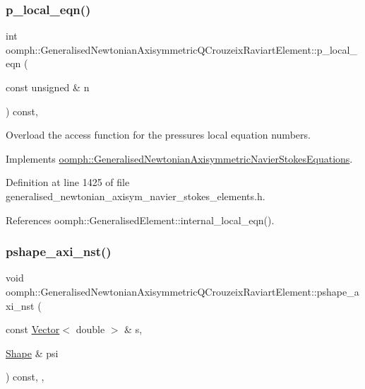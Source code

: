 \subsubsection{\texorpdfstring{p\+\_\+local\+\_\+eqn()}{p\_local\_eqn()}}
{\footnotesize\ttfamily int oomph\+::\+Generalised\+Newtonian\+Axisymmetric\+Q\+Crouzeix\+Raviart\+Element\+::p\+\_\+local\+\_\+eqn (\begin{DoxyParamCaption}\item[{const unsigned \&}]{n }\end{DoxyParamCaption}) const\hspace{0.3cm}{\ttfamily [inline]}, {\ttfamily [virtual]}}



Overload the access function for the pressure\textquotesingle{}s local equation numbers. 



Implements \hyperlink{classoomph_1_1GeneralisedNewtonianAxisymmetricNavierStokesEquations_a1432210bfed0cd920d1fb1c4d9e73d3f}{oomph\+::\+Generalised\+Newtonian\+Axisymmetric\+Navier\+Stokes\+Equations}.



Definition at line 1425 of file generalised\+\_\+newtonian\+\_\+axisym\+\_\+navier\+\_\+stokes\+\_\+elements.\+h.



References oomph\+::\+Generalised\+Element\+::internal\+\_\+local\+\_\+eqn().

\mbox{\label{classoomph_1_1GeneralisedNewtonianAxisymmetricQCrouzeixRaviartElement_a06e8ec5317b4d6a746eaec17c65a2787}} 
\subsubsection{\texorpdfstring{pshape\+\_\+axi\+\_\+nst()}{pshape\_axi\_nst()}\hspace{0.1cm}{\footnotesize\ttfamily [1/2]}}
{\footnotesize\ttfamily void oomph\+::\+Generalised\+Newtonian\+Axisymmetric\+Q\+Crouzeix\+Raviart\+Element\+::pshape\+\_\+axi\+\_\+nst (\begin{DoxyParamCaption}\item[{const \hyperlink{classoomph_1_1Vector}{Vector}$<$ double $>$ \&}]{s,  }\item[{\hyperlink{classoomph_1_1Shape}{Shape} \&}]{psi }\end{DoxyParamCaption}) const\hspace{0.3cm}{\ttfamily [inline]}, {\ttfamily [protected]}, {\ttfamily [virtual]}}



